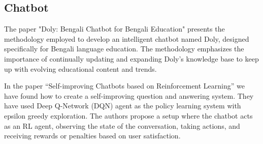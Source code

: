 \subsection{Chatbot}\label{subsec:chatbot}
The paper "Doly: Bengali Chatbot for Bengali Education" \cite{doly} presents the methodology employed to develop an intelligent chatbot named Doly, designed specifically for Bengali language education.
The methodology emphasizes the importance of continually updating and expanding Doly's knowledge base to keep up with evolving educational content and trends.

In the paper “Self-improving Chatbots based on Reinforcement Learning” \cite{rl-chatbot} we have found how to create a self-improving question and answering system.
They have used Deep Q-Network (DQN) agent as the policy learning system with epsilon greedy exploration.
The authors propose a setup where the chatbot acts as an RL agent, observing the state of the conversation, taking actions, and receiving rewards or penalties based on user satisfaction.

